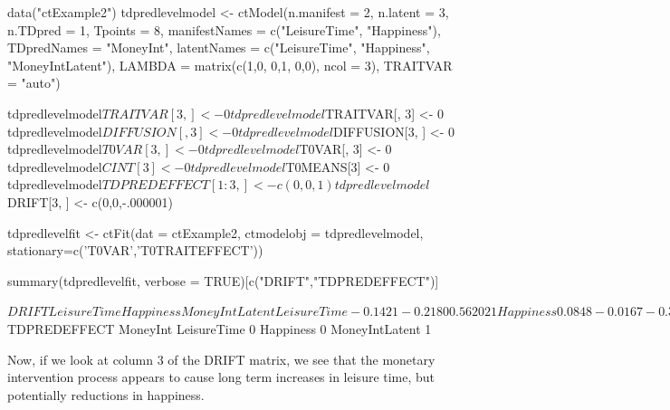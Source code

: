 \documentclass[nojss]{jss}\usepackage[]{graphicx}\usepackage[]{color}
\begin{document}
\begin{Schunk}
\begin{Sinput}
data("ctExample2")
tdpredlevelmodel <- ctModel(n.manifest = 2, n.latent = 3, 
  n.TDpred = 1, 
  Tpoints = 8, manifestNames = c("LeisureTime", "Happiness"), 
  TDpredNames = "MoneyInt", 
  latentNames = c("LeisureTime", "Happiness", "MoneyIntLatent"),
  LAMBDA = matrix(c(1,0, 0,1, 0,0), ncol = 3), TRAITVAR = "auto")

tdpredlevelmodel$TRAITVAR[3, ] <- 0
tdpredlevelmodel$TRAITVAR[, 3] <- 0
tdpredlevelmodel$DIFFUSION[, 3] <- 0
tdpredlevelmodel$DIFFUSION[3, ] <- 0
tdpredlevelmodel$T0VAR[3, ] <- 0
tdpredlevelmodel$T0VAR[, 3] <- 0
tdpredlevelmodel$CINT[3] <- 0
tdpredlevelmodel$T0MEANS[3] <- 0
tdpredlevelmodel$TDPREDEFFECT[1:3, ] <- c(0,0,1)
tdpredlevelmodel$DRIFT[3, ] <- c(0,0,-.000001)

tdpredlevelfit <- ctFit(dat = ctExample2, 
  ctmodelobj = tdpredlevelmodel, 
  stationary=c('T0VAR','T0TRAITEFFECT'))

summary(tdpredlevelfit, verbose = TRUE)[c("DRIFT","TDPREDEFFECT")]
\end{Sinput}
\begin{Soutput}
$DRIFT
               LeisureTime Happiness MoneyIntLatent
LeisureTime        -0.1421   -0.2180       0.562021
Happiness           0.0848   -0.0167      -0.348001
MoneyIntLatent      0.0000    0.0000      -0.000001

$TDPREDEFFECT
               MoneyInt
LeisureTime           0
Happiness             0
MoneyIntLatent        1
\end{Soutput}
\end{Schunk}

Now, if we look at column 3 of the DRIFT matrix, we see that the monetary intervention process appears to cause long term increases in leisure time, but potentially reductions in happiness. 
\end{document}
